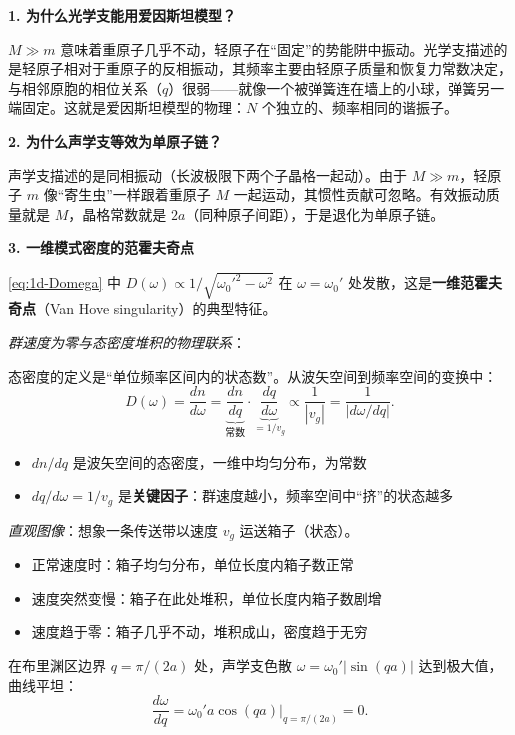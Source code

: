 \begin{insightbox}[物理图像与概念深化]
\textbf{1. 为什么光学支能用爱因斯坦模型？}

$M\gg m$ 意味着重原子几乎不动，轻原子在``固定''的势能阱中振动。光学支描述的是轻原子相对于重原子的反相振动，其频率主要由轻原子质量和恢复力常数决定，与相邻原胞的相位关系（$q$）很弱——就像一个被弹簧连在墙上的小球，弹簧另一端固定。这就是爱因斯坦模型的物理：$N$ 个独立的、频率相同的谐振子。

\textbf{2. 为什么声学支等效为单原子链？}

声学支描述的是同相振动（长波极限下两个子晶格一起动）。由于 $M\gg m$，轻原子 $m$ 像``寄生虫''一样跟着重原子 $M$ 一起运动，其惯性贡献可忽略。有效振动质量就是 $M$，晶格常数就是 $2a$（同种原子间距），于是退化为单原子链。

\textbf{3. 一维模式密度的范霍夫奇点}

\eqref{eq:1d-Domega} 中 $D(\omega)\propto1/\sqrt{\omega_0'^2-\omega^2}$ 在 $\omega=\omega_0'$ 处发散，这是\textbf{一维范霍夫奇点}（Van Hove singularity）的典型特征。

\textit{群速度为零与态密度堆积的物理联系}：

态密度的定义是``单位频率区间内的状态数''。从波矢空间到频率空间的变换中：
\begin{equation}
D(\omega)=\frac{dn}{d\omega}=\underbrace{\frac{dn}{dq}}_{\text{常数}}\cdot\underbrace{\frac{dq}{d\omega}}_{=1/v_g}
\propto\frac{1}{|v_g|}=\frac{1}{|d\omega/dq|}.
\end{equation}

\begin{itemize}
    \item $dn/dq$ 是波矢空间的态密度，一维中均匀分布，为常数
    \item $dq/d\omega=1/v_g$ 是\textbf{关键因子}：群速度越小，频率空间中``挤''的状态越多
\end{itemize}

\textit{直观图像}：想象一条传送带以速度 $v_g$ 运送箱子（状态）。
\begin{itemize}
    \item 正常速度时：箱子均匀分布，单位长度内箱子数正常
    \item 速度突然变慢：箱子在此处堆积，单位长度内箱子数剧增
    \item 速度趋于零：箱子几乎不动，堆积成山，密度趋于无穷
\end{itemize}

在布里渊区边界 $q=\pi/(2a)$ 处，声学支色散 $\omega=\omega_0'|\sin(qa)|$ 达到极大值，曲线平坦：
\begin{equation}
\frac{d\omega}{dq}=\omega_0'a\cos(qa)\big|_{q=\pi/(2a)}=0.
\end{equation}


\end{insightbox}
